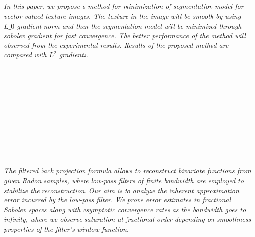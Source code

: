 \begin{multicols}{2}
\\ 
      \\
      \\\\
      \\
      \\\\
      \\
      \\\\
      \\
      \\\\
\\
    \textit{In this paper, we propose a method for minimization of segmentation model for vector-valued texture images. The texture in the image will be smooth by using $L\_0$ gradient norm and then the segmentation model will be minimized through sobolev gradient for fast convergence. The better performance of the method will observed from the experimental results. Results of the proposed method are compared with $L^2$ gradients.}\\
\\ 
      \\
      \\\\
      \\
      \\\\
      \\
      \\\\
\\
    \textit{The filtered back projection formula allows to reconstruct bivariate functions from given Radon samples, where low-pass filters of finite bandwidth are employed to stabilize the reconstruction. Our aim is to analyze the inherent approximation error incurred by the low-pass filter. We prove error estimates in fractional Sobolev spaces along with asymptotic convergence rates as the bandwidth goes to infinity, where we observe saturation at fractional order depending on smoothness properties of the filter's window function.}\\
\\ 

\end{multicols}
